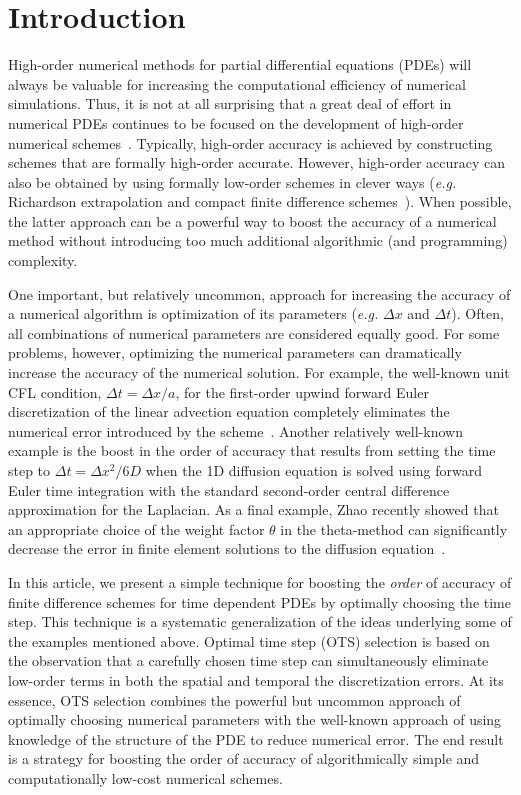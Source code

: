 \documentclass[fleqn,12pt,twoside]{article}
\def\dt{\Delta t}
\def\dx{\Delta x}
\def\eg{\emph{e.g. }}
\begin{document}
\section{Introduction}
High-order numerical methods for partial differential equations (PDEs) will 
always be valuable for increasing the computational efficiency of numerical 
simulations.  Thus, it is not at all surprising that a great deal of effort in 
numerical PDEs continues to be focused on the development of high-order 
numerical 
schemes~\cite{spotz_2001,bruger_2005,gibou_2005,ito_2005,shukla_2005,heidenreich_2007,shukla_2007}.  
Typically, high-order accuracy is achieved by constructing
schemes that are formally high-order accurate.  However, high-order 
accuracy can also be obtained by using formally low-order schemes in clever 
ways (\eg Richardson extrapolation and compact finite difference 
schemes~\cite{spotz_2001}).  When possible, the latter approach can be a 
powerful way to boost the accuracy of a numerical method without
introducing too much additional algorithmic (and programming) complexity.

One important, but relatively uncommon, approach for increasing the accuracy
of a numerical algorithm is optimization of its parameters
(\eg $\dx$ and $\dt$).  Often, all combinations of numerical parameters are
considered equally good.  For some problems, however, optimizing the numerical
parameters can dramatically increase the accuracy of the numerical solution.
For example, the well-known unit CFL condition, $\dt = \dx/a$, for the
first-order upwind forward Euler discretization of the linear advection
equation completely eliminates the numerical error introduced by the 
scheme~\cite{leveque_book_2002}.  Another relatively well-known example is the
boost in the order of accuracy that results from setting the time step to 
$\dt = \dx^2/6D$ when the 1D diffusion equation is solved using forward Euler 
time integration with the standard second-order central difference 
approximation for the Laplacian.  As a final example, Zhao recently showed
that an appropriate choice of the weight factor $\theta$ in the theta-method
can significantly decrease the error in finite element solutions to the
diffusion equation~\cite{zhao_2006}. 

In this article, we present a simple technique for boosting the \emph{order} of 
accuracy of finite difference schemes for time dependent PDEs by optimally 
choosing the time step.  This technique is a systematic generalization of
the ideas underlying some of the examples mentioned above.  Optimal time step
(OTS) selection is based on the observation that a carefully chosen time step
can simultaneously eliminate low-order terms in both the spatial and temporal
the discretization errors.  At its essence, OTS selection combines the 
powerful but uncommon approach of optimally choosing numerical parameters 
with the well-known approach of using knowledge of the structure of the
PDE to reduce numerical error.  The end result is a strategy for boosting
the order of accuracy of algorithmically simple and computationally low-cost
numerical schemes.
\end{document}
